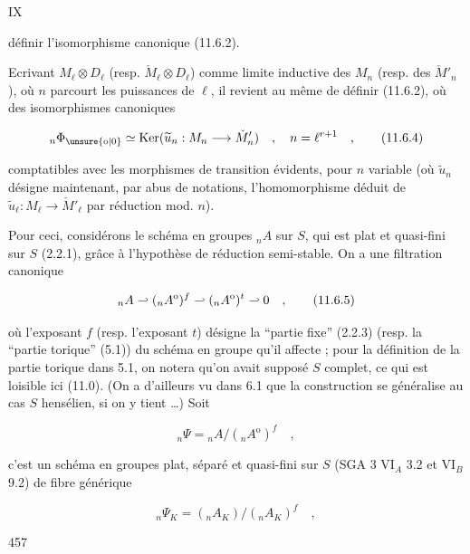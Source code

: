 
\hfill IX

définir l'isomorphisme canonique (11.6.2).

Ecrivant $M_\ell\otimes D_\ell$ (resp. $\check{M}_\ell\otimes D_\ell$) comme limite inductive des $M_n$ (resp. des $\check{M}'_n$), où $n$ parcourt les puissances de $\ell$, il revient au même de définir (11.6.2), où des isomorphismes canoniques

\[
{}_n\Phi_{\unsure{\mathrm{o}|0}}\simeq\operatorname{Ker}(\widetilde{u}_n:M_n\longrightarrow\check{M}'_n)\quad,\quad n=\ell^{r+1}\quad,\tag*{(11.6.4)}
\]

comptatibles avec les morphismes de transition évidents, pour $n$ variable\handwritten{\unsure{!}} (où $\widetilde{u}_n$ désigne maintenant, par abus de notations, l'homomorphisme déduit de $\widetilde{u}_\ell:M_\ell\longrightarrow\check{M}'_\ell$ par réduction mod. $n$).

Pour ceci, considérons le schéma en groupes $ {}_nA$ sur $S$, qui est plat et quasi-fini sur $S$ (2.2.1), grâce à l'hypothèse de réduction semi-stable. On a une filtration canonique


\[
{}_nA\mathrel{\relbar\joinrel\rhook}({}_nA^{\mathrm{o}})^f\mathrel{\relbar\joinrel\rhook}({}_nA^{\mathrm{o}})^t\mathrel{\relbar\joinrel\rhook}0\quad,\tag*{(11.6.5)}
\]

où l'exposant $f$ (resp. l'exposant $t$) désigne la ``partie fixe'' (2.2.3) (resp. la ``partie torique'' (5.1)) du schéma en groupe qu'il affecte ; pour la définition de la partie torique dans 5.1, on notera qu'on avait supposé $S$ complet, ce qui est loisible ici (11.0). (On a d'ailleurs vu dans 6.1 que la construction se généralise au cas $S$ hensélien, si on y tient \ldots) Soit

\[
{}_n\Psi={}_nA/({}_nA^{\mathrm{o}})^f\quad,\tag*{(11.6.6)}
\]

c'est un schéma en groupes plat, séparé et quasi-fini sur $S$ (SGA 3 $\mathrm{VI}_A$ 3.2 et $\mathrm{VI}_B$ 9.2) de fibre générique

\[
{}_n\Psi_K=({}_nA_K)/({}_nA_K)^f\quad,
\]


457

